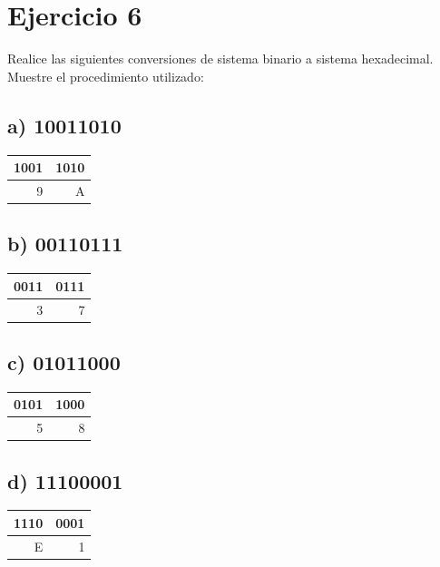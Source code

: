 \documentclass[12pt]{article}
\begin{document}
\section*{Ejercicio 6}
\label{sec:org18da1a9}
Realice las siguientes conversiones de sistema binario a sistema hexadecimal. Muestre el procedimiento utilizado:

\subsection*{a) 10011010}
\label{sec:org4e94c7e}
\begin{center}
\begin{tabular}{rr}
1001 & 1010\\
\hline
9 & A\\
\end{tabular}
\end{center}

\subsection*{b) 00110111}
\label{sec:org78aceeb}
\begin{center}
\begin{tabular}{rr}
0011 & 0111\\
\hline
3 & 7\\
\end{tabular}
\end{center}

\subsection*{c) 01011000}
\label{sec:orgbc206e3}
\begin{center}
\begin{tabular}{rr}
0101 & 1000\\
\hline
5 & 8\\
\end{tabular}
\end{center}

\subsection*{d) 11100001}
\label{sec:orgd68dbad}
\begin{center}
\begin{tabular}{rr}
1110 & 0001\\
\hline
E & 1\\
\end{tabular}
\end{center}
\end{document}
